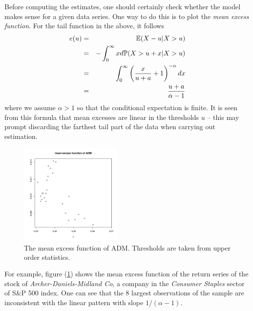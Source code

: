 \documentclass{article}
\begin{document}
Before computing the estimates, one should certainly check whether the
model makes sense for a given data series. One way to do this is to
plot the {\it mean excess function}. For the tail function in the
above, it follows
\begin{eqnarray}
  e(u) &=& \mathbb{E} (X - u | X > u) \nonumber \\
  &=& -\int_0^\infty x  d\mathbb{P}(X > u + x | X > u) \nonumber \\
  &=& \int_0^\infty \left(
  {x \over u + a} + 1
  \right)^{-\alpha} dx \nonumber \\
  &=& {u + a \over \alpha - 1} \label{eq:MEF}
\end{eqnarray}
where we assume $\alpha > 1$ so that the conditional expectation is
finite. It is seen from this formula that mean excesses are linear in
the thresholds $u$ -- this may prompt discarding the farthest tail
part of the data when carrying out estimation.
\begin{figure}
  \centering
  \includegraphics[width=0.45\textwidth]{ADM_MEF.pdf}
  \caption{\scriptsize The mean excess function of ADM. Thresholds are
    taken from upper order statistics.}
  \label{fig:ADM_MEF}
\end{figure}

For example, figure (\ref{fig:ADM_MEF}) shows the mean
excess function of the return series of the stock of {\it
  Archer-Daniels-Midland Co}, a company in the {\it Consumer Staples}
sector of S\&P 500 index.
One can see that the 8 largest observations of the sample are
inconsistent with the linear pattern with slope $1/(\alpha - 1)$.
\end{document}
